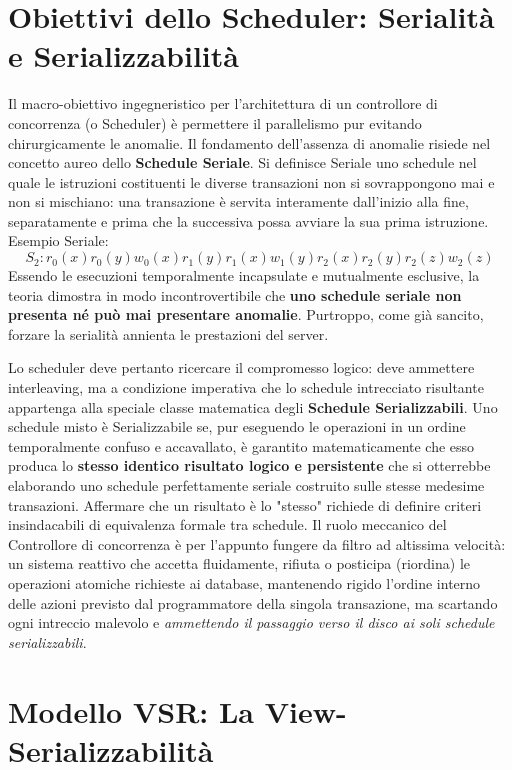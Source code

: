 \section{Obiettivi dello Scheduler: Serialità e Serializzabilità}

Il macro-obiettivo ingegneristico per l'architettura di un controllore di concorrenza (o Scheduler) è permettere il parallelismo pur evitando chirurgicamente le anomalie. Il fondamento dell'assenza di anomalie risiede nel concetto aureo dello \textbf{Schedule Seriale}.
Si definisce Seriale uno schedule nel quale le istruzioni costituenti le diverse transazioni non si sovrappongono mai e non si mischiano: una transazione è servita interamente dall'inizio alla fine, separatamente e prima che la successiva possa avviare la sua prima istruzione.
Esempio Seriale:
$$S_2: r_0(x) r_0(y) w_0(x) r_1(y) r_1(x) w_1(y) r_2(x) r_2(y) r_2(z) w_2(z)$$
Essendo le esecuzioni temporalmente incapsulate e mutualmente esclusive, la teoria dimostra in modo incontrovertibile che \textbf{uno schedule seriale non presenta né può mai presentare anomalie}. Purtroppo, come già sancito, forzare la serialità annienta le prestazioni del server.

Lo scheduler deve pertanto ricercare il compromesso logico: deve ammettere interleaving, ma a condizione imperativa che lo schedule intrecciato risultante appartenga alla speciale classe matematica degli \textbf{Schedule Serializzabili}.
Uno schedule misto è Serializzabile se, pur eseguendo le operazioni in un ordine temporalmente confuso e accavallato, è garantito matematicamente che esso produca lo \textbf{stesso identico risultato logico e persistente} che si otterrebbe elaborando uno schedule perfettamente seriale costruito sulle stesse medesime transazioni.
Affermare che un risultato è lo "stesso" richiede di definire criteri insindacabili di equivalenza formale tra schedule.
Il ruolo meccanico del Controllore di concorrenza è per l'appunto fungere da filtro ad altissima velocità: un sistema reattivo che accetta fluidamente, rifiuta o posticipa (riordina) le operazioni atomiche richieste ai database, mantenendo rigido l'ordine interno delle azioni previsto dal programmatore della singola transazione, ma scartando ogni intreccio malevolo e \textit{ammettendo il passaggio verso il disco ai soli schedule serializzabili}.

\section{Modello VSR: La View-Serializzabilità}

